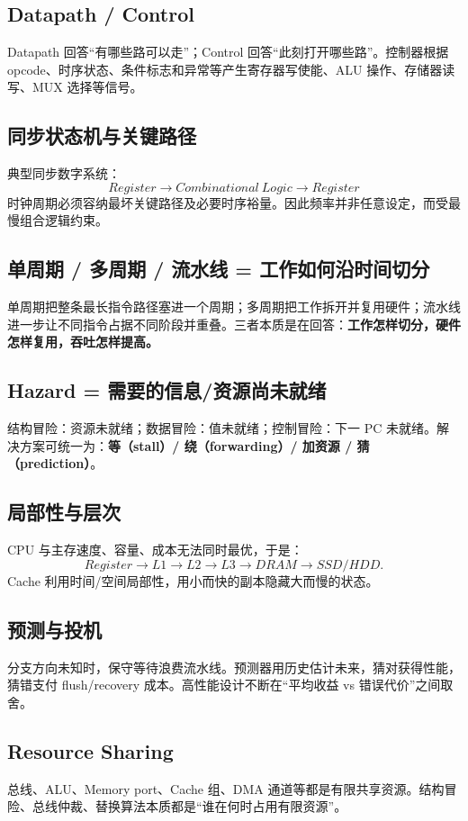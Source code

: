 \documentclass[11pt,a4paper,openany]{ctexbook}
\newcommand{\key}[1]{\textbf{\color{deep}#1}}
\begin{document}
\subsection{Datapath / Control}
Datapath 回答“有哪些路可以走”；Control 回答“此刻打开哪些路”。控制器根据 opcode、时序状态、条件标志和异常等产生寄存器写使能、ALU 操作、存储器读写、MUX 选择等信号。

\subsection{同步状态机与关键路径}
典型同步数字系统：
\[
\boxed{Register\rightarrow Combinational\ Logic\rightarrow Register}
\]
时钟周期必须容纳最坏关键路径及必要时序裕量。因此频率并非任意设定，而受最慢组合逻辑约束。

\subsection{单周期 / 多周期 / 流水线 = 工作如何沿时间切分}
单周期把整条最长指令路径塞进一个周期；多周期把工作拆开并复用硬件；流水线进一步让不同指令占据不同阶段并重叠。三者本质是在回答：\key{工作怎样切分，硬件怎样复用，吞吐怎样提高。}

\subsection{Hazard = 需要的信息/资源尚未就绪}
结构冒险：资源未就绪；数据冒险：值未就绪；控制冒险：下一 PC 未就绪。解决方案可统一为：\key{等（stall）/ 绕（forwarding）/ 加资源 / 猜（prediction）}。

\subsection{局部性与层次}
CPU 与主存速度、容量、成本无法同时最优，于是：
\[
Register\rightarrow L1\rightarrow L2\rightarrow L3\rightarrow DRAM\rightarrow SSD/HDD.
\]
Cache 利用时间/空间局部性，用小而快的副本隐藏大而慢的状态。

\subsection{预测与投机}
分支方向未知时，保守等待浪费流水线。预测器用历史估计未来，猜对获得性能，猜错支付 flush/recovery 成本。高性能设计不断在“平均收益 vs 错误代价”之间取舍。

\subsection{Resource Sharing}
总线、ALU、Memory port、Cache 组、DMA 通道等都是有限共享资源。结构冒险、总线仲裁、替换算法本质都是“谁在何时占用有限资源”。
\end{document}
